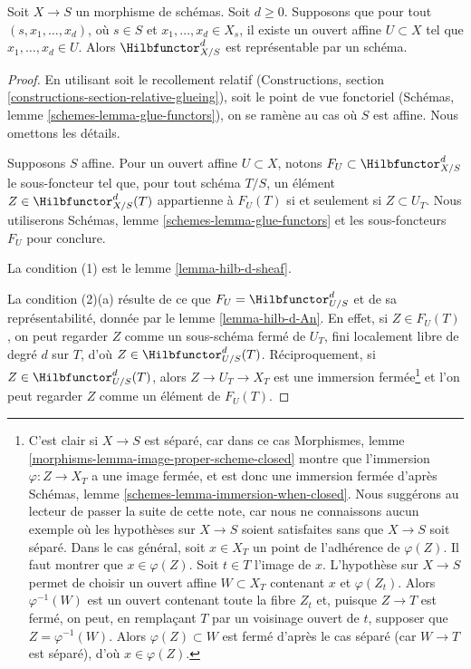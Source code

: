 \begin{proposition}
\label{proposition-hilb-d-representable}
Soit $X \to S$ un morphisme de schémas. Soit $d \geq 0$. Supposons
que pour tout $(s, x_1, \ldots, x_d)$, où $s \in S$ et
$x_1, \ldots, x_d \in X_s$, il existe un ouvert affine $U \subset X$
tel que $x_1, \ldots, x_d \in U$. Alors $\Hilbfunctor^d_{X/S}$ est
représentable par un schéma.
\end{proposition}

\begin{proof}
En utilisant soit le recollement relatif (Constructions, section
\ref{constructions-section-relative-glueing}), soit
le point de vue fonctoriel
(Schémas, lemme \ref{schemes-lemma-glue-functors}),
on se ramène au cas où $S$ est affine. Nous omettons les détails.

\medskip\noindent
Supposons $S$ affine. Pour un ouvert affine $U \subset X$, notons
$F_U \subset \Hilbfunctor^d_{X/S}$ le sous-foncteur tel que,
pour tout schéma $T/S$, un élément $Z \in \Hilbfunctor^d_{X/S}(T)$
appartienne à $F_U(T)$ si et seulement si $Z \subset U_T$. Nous utiliserons
Schémas, lemme \ref{schemes-lemma-glue-functors}
et les sous-foncteurs $F_U$ pour conclure.

\medskip\noindent
La condition (1) est le lemme \ref{lemma-hilb-d-sheaf}.

\medskip\noindent
La condition (2)(a) résulte de ce que $F_U = \Hilbfunctor^d_{U/S}$
et de sa représentabilité, donnée par le lemme \ref{lemma-hilb-d-An}.
En effet, si $Z \in F_U(T)$, on peut regarder $Z$ comme un sous-schéma fermé
de $U_T$, fini localement libre de degré $d$ sur $T$, d'où
$Z \in \Hilbfunctor^d_{U/S}(T)$. Réciproquement, si $Z \in \Hilbfunctor^d_{U/S}(T)$,
alors $Z \to U_T \to X_T$ est une immersion fermée\footnote{C'est clair
si $X \to S$ est séparé, car dans ce cas Morphismes, lemme
\ref{morphisms-lemma-image-proper-scheme-closed}
montre que l'immersion $\varphi : Z \to X_T$ a une image fermée,
et est donc une immersion fermée d'après
Schémas, lemme \ref{schemes-lemma-immersion-when-closed}. Nous suggérons au
lecteur de passer la suite de cette note, car nous ne connaissons aucun exemple
où les hypothèses sur $X \to S$ soient satisfaites sans que $X \to S$ soit séparé.
Dans le cas général, soit $x \in X_T$ un point de l'adhérence de
$\varphi(Z)$. Il faut montrer que $x \in \varphi(Z)$. Soit $t \in T$ l'image
de $x$. L'hypothèse sur $X \to S$ permet de choisir un ouvert affine
$W \subset X_T$ contenant $x$ et $\varphi(Z_t)$. Alors $\varphi^{-1}(W)$
est un ouvert contenant toute la fibre $Z_t$ et, puisque $Z \to T$ est fermé,
on peut, en remplaçant $T$ par un voisinage ouvert de $t$, supposer que
$Z = \varphi^{-1}(W)$. Alors $\varphi(Z) \subset W$ est fermé d'après le
cas séparé (car $W \to T$ est séparé), d'où $x \in \varphi(Z)$.}
et l'on peut regarder $Z$ comme un élément de $F_U(T)$.


\end{proof}
